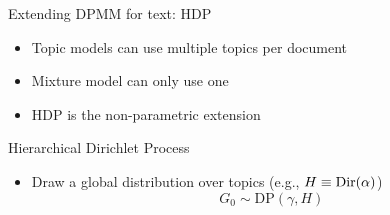 \documentclass[compress]{beamer}
\begin{document}
\begin{frame}{Extending DPMM for text: HDP}

\begin{itemize}
  \item Topic models can use multiple topics per document
  \item Mixture model can only use one
  \item HDP is the non-parametric extension 
\end{itemize}

\end{frame}

\begin{frame}{Hierarchical Dirichlet Process}

  \begin{itemize}
    \item Draw a global distribution over topics (e.g., $H\equiv \mbox{Dir}(\alpha)$)
      \begin{equation}
        G_0 \sim \mbox{DP}(\gamma, H)
      \end{equation}
  \end{itemize}

\end{frame}
\end{document}
